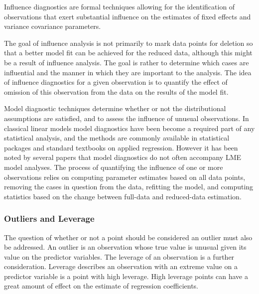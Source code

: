 \documentclass[12pt, a4paper]{report}
\theoremstyle{plain}
\theoremstyle{definition}
\theoremstyle{remark}
\begin{document}
	
	Influence diagnostics are formal techniques allowing for the identification of observations that exert substantial  influence on the estimates of fixed effects and variance covariance parameters.
		
		
	The goal of influence analysis is not primarily to mark data
	points for deletion so that a better model fit can be achieved for the reduced data, although this might be a
	result of influence analysis. The goal is rather to determine which cases are influential and the manner in
	which they are important to the analysis. The idea of influence diagnostics for a given observation is to quantify the effect of omission of this observation
	from the data on the results of the model fit. %
	
	Model diagnostic techniques determine whether or not the distributional assumptions are satisfied, and to assess the influence of unusual observations. In classical linear models model diagnostics have been become a required part of any statistical analysis, and the methods are commonly available in statistical packages and standard textbooks on applied regression. However it has been noted by several papers that model diagnostics do not often accompany LME model analyses.
	The process of quantifying the influence of one or more observations relies on computing parameter estimates based on all data points, removing the cases in question from the data, refitting the model, and computing statistics based on the change between full-data and reduced-data estimation.
	
	
	
	
	
	

	\subsubsection{Outliers and Leverage}
	
	
	
	The question of whether or not a point should be considered an outlier must also be addressed. An outlier is an observation whose true value is unusual given its value on the predictor variables. The leverage of an observation is a further consideration. Leverage describes an observation with an extreme value on a predictor variable is a point with high leverage. High leverage points can have a great amount of effect on the estimate of regression coefficients.
	
\end{document}

